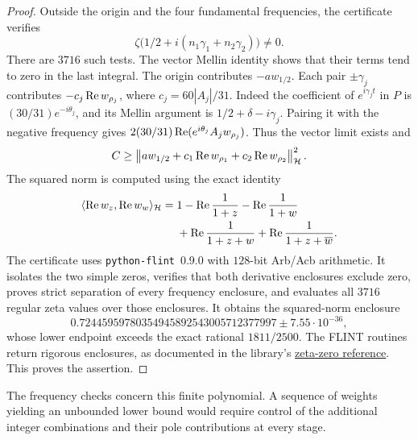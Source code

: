 \begin{proof}
Outside the origin and the four fundamental frequencies,
the certificate verifies
\[
 \zeta\bigl(1/2+i(n_1\gamma_1+n_2\gamma_2)\bigr)\ne0.
\]
There are \(3716\) such tests. The vector Mellin identity shows
that their terms tend to zero in the last integral. The origin
contributes \(-a w_{1/2}\). Each pair \(\pm\gamma_j\)
contributes \(-c_j\operatorname{Re} w_{\rho_j}\), where
\(c_j=60|A_j|/31\). Indeed the coefficient of
\(e^{i\gamma_jt}\) in \(P\) is
\((30/31)e^{-i\theta_j}\), and its Mellin argument is
\(1/2+\delta-i\gamma_j\). Pairing it with the negative
frequency gives \(2(30/31)\operatorname{Re}(e^{i\theta_j}A_jw_{\rho_j})\).
Thus the vector limit exists and
\[
 C\ge\left\|a w_{1/2}
             +c_1\operatorname{Re} w_{\rho_1}+c_2\operatorname{Re} w_{\rho_2}
      \right\|_{\mathcal H}^{2}.
\]
The squared norm is computed using the exact identity
\begin{align*}
 \langle\operatorname{Re} w_z,\operatorname{Re} w_w\rangle_{\mathcal H}
   ={}&1-\operatorname{Re}\frac1{1+z}-\operatorname{Re}\frac1{1+w}\notag\\
      &+\operatorname{Re}\frac1{1+z+w}
         +\operatorname{Re}\frac1{1+z+\overline w}.
\end{align*}
The certificate uses \texttt{python-flint}~0.9.0 with
\(128\)-bit Arb/Acb arithmetic. It isolates the two simple
zeros, verifies that both derivative enclosures exclude zero,
proves strict separation of every frequency enclosure, and
evaluates all \(3716\) regular zeta values over those
enclosures. It obtains the squared-norm enclosure
\[
 0.72445959780354945892543005712377997
       \ \mathord{\pm}\ 7.55\cdot10^{-36},
\]
whose lower endpoint exceeds the exact rational \(1811/2500\).
The FLINT routines return rigorous enclosures, as documented
in the library's
\href{https://flintlib.org/doc/acb_dirichlet/index.html\#zeros-of-the-riemann-zeta-function}%
{zeta-zero reference}. This proves the assertion.
\end{proof}

The frequency checks concern this finite polynomial. A sequence
of weights yielding an unbounded lower bound would require
control of the additional integer combinations and their pole
contributions at every stage.
